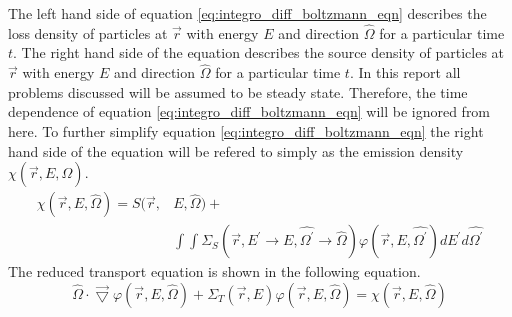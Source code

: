 The left hand side of equation \ref{eq:integro_diff_boltzmann_eqn} describes 
the loss density of particles at $\vec{r}$ with energy $E$ and direction 
$\hat{\Omega}$ for a particular time $t$. The right hand side of the equation 
describes the source density of particles at $\vec{r}$ with energy $E$ and 
direction $\hat{\Omega}$ for a particular time $t$. In this report all
problems discussed will be assumed to be steady state. Therefore, the time
dependence of equation \ref{eq:integro_diff_boltzmann_eqn} will be ignored 
from here. To further simplify equation \ref{eq:integro_diff_boltzmann_eqn} the 
right hand side of the equation will be refered to simply as the emission 
density $\chi(\vec{r},E,\hat{\Omega})$.
\begin{equation}
  \begin{split}
    \chi(\vec{r},E,\hat{\Omega}) = S(\vec{r},&E,\hat{\Omega}) + \\
    & \int\int \Sigma_S(\vec{r},E^{'} \to E,\hat{\Omega^{'}} \to \hat{\Omega})
    \varphi(\vec{r},E,\hat{\Omega^{'}}) dE^{'}d\hat{\Omega^{'}}
  \end{split}
  \label{eq:emission_density}
\end{equation}
The reduced transport equation is shown in the following equation.
\begin{equation}
  \hat{\Omega} \cdot \vec{\bigtriangledown} \varphi(\vec{r},E,\hat{\Omega})
  + \Sigma_T(\vec{r},E) \varphi(\vec{r},E,\hat{\Omega}) =  
 \chi(\vec{r},E,\hat{\Omega})
  \label{eq:reduced_transport_eqn}
\end{equation}

